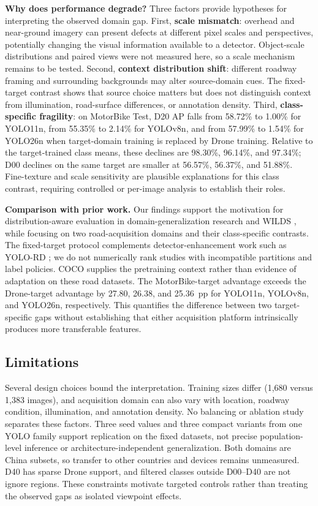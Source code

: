 \documentclass[conference,a4paper]{IEEEtran}
\begin{document}
\textbf{Why does performance degrade?} Three factors provide hypotheses for interpreting the observed domain gap. First, \textbf{scale mismatch}: overhead and near-ground imagery can present defects at different pixel scales and perspectives, potentially changing the visual information available to a detector. Object-scale distributions and paired views were not measured here, so a scale mechanism remains to be tested. Second, \textbf{context distribution shift}: different roadway framing and surrounding backgrounds may alter source-domain cues. The fixed-target contrast shows that source choice matters but does not distinguish context from illumination, road-surface differences, or annotation density. Third, \textbf{class-specific fragility}: on MotorBike Test, D20 AP falls from 58.72\% to 1.00\% for YOLO11n, from 55.35\% to 2.14\% for YOLOv8n, and from 57.99\% to 1.54\% for YOLO26n when target-domain training is replaced by Drone training. Relative to the target-trained class means, these declines are 98.30\%, 96.14\%, and 97.34\%; D00 declines on the same target are smaller at 56.57\%, 56.37\%, and 51.88\%. Fine-texture and scale sensitivity are plausible explanations for this class contrast, requiring controlled or per-image analysis to establish their roles.

\textbf{Comparison with prior work.} Our findings support the motivation for distribution-aware evaluation in domain-generalization research and WILDS \cite{zhou2023survey,koh2021wilds}, while focusing on two road-acquisition domains and their class-specific contrasts. The fixed-target protocol complements detector-enhancement work such as YOLO-RD \cite{wang2025yolord}; we do not numerically rank studies with incompatible partitions and label policies. COCO \cite{lin2014coco} supplies the pretraining context rather than evidence of adaptation on these road datasets. The MotorBike-target advantage exceeds the Drone-target advantage by 27.80, 26.38, and 25.36~pp for YOLO11n, YOLOv8n, and YOLO26n, respectively. This quantifies the difference between two target-specific gaps without establishing that either acquisition platform intrinsically produces more transferable features.

\subsection{Limitations}
Several design choices bound the interpretation. Training sizes differ (1,680 versus 1,383 images), and acquisition domain can also vary with location, roadway condition, illumination, and annotation density. No balancing or ablation study separates these factors. Three seed values and three compact variants from one YOLO family support replication on the fixed datasets, not precise population-level inference or architecture-independent generalization. Both domains are China subsets, so transfer to other countries and devices remains unmeasured. D40 has sparse Drone support, and filtered classes outside D00--D40 are not ignore regions. These constraints motivate targeted controls rather than treating the observed gaps as isolated viewpoint effects.
\end{document}
